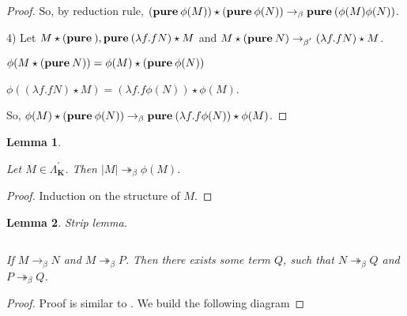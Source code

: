 \documentclass[a4paper]{article}
\newtheorem{lemma}{Lemma}
\begin{document}
\begin{proof}
So, by reduction rule, $({\bf pure \: } \phi(M)) \star ({\bf pure \: } \phi(N)) \rightarrow_{\beta} {\bf
pure \: } (\phi(M) \phi(N))$.

\vspace{\baselineskip}

4) Let $M \star ({\bf pure \: }), {\bf pure \: } (\lambda f. f N) \star M$ and $M \star ({\bf pure \: } N)
\rightarrow_{\beta^{'}} (\lambda f. f N) \star M$.

$\phi(M \star ({\bf pure \: } N)) = \phi(M) \star ({\bf pure \: } \phi(N))$

$\phi((\lambda f. f N) \star M) = (\lambda f. f \phi(N)) \star \phi(M)$.

So, $\phi(M) \star ({\bf pure \: } \phi(N)) \rightarrow_{\beta} {\bf pure \: } (\lambda f. f \phi(N)) \star
\phi(M)$.
\end{proof}

\begin{lemma}

$ $

Let $M \in \Lambda^{'}_{\textbf{K}}$. Then $|M| \twoheadrightarrow_{\beta} \phi(M)$.

\end{lemma}

\begin{proof}

Induction on the structure of $M$.

\end{proof}

\begin{lemma} Strip lemma.

$ $

If $M \rightarrow_{\beta} N$ and $M \twoheadrightarrow_{\beta} P$. Then there exists some term $Q$, such that
$N \twoheadrightarrow_{\beta} Q$ and $P \twoheadrightarrow_{\beta} Q$.

\end{lemma}

\begin{proof}

  Proof is similar to \cite{Baren} \cite{Baren2}. We build the following diagram

\vspace{\baselineskip}


\end{proof}
\end{document}
